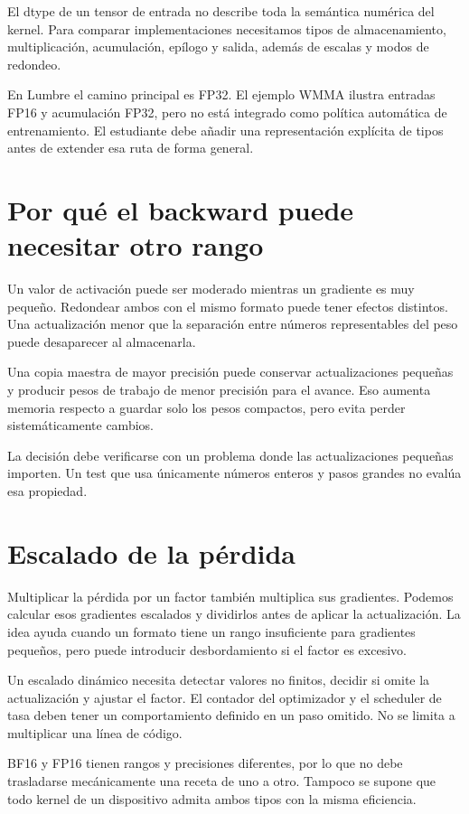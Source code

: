 \documentclass[12pt,a4paper,oneside]{report}
\begin{document}
El dtype de un tensor de entrada no describe toda la semántica numérica del kernel. Para comparar implementaciones necesitamos tipos de almacenamiento, multiplicación, acumulación, epílogo y salida, además de escalas y modos de redondeo.

En Lumbre el camino principal es FP32. El ejemplo WMMA ilustra entradas FP16 y acumulación FP32, pero no está integrado como política automática de entrenamiento. El estudiante debe añadir una representación explícita de tipos antes de extender esa ruta de forma general.

\section{Por qué el backward puede necesitar otro rango}
Un valor de activación puede ser moderado mientras un gradiente es muy pequeño. Redondear ambos con el mismo formato puede tener efectos distintos. Una actualización menor que la separación entre números representables del peso puede desaparecer al almacenarla.

Una copia maestra de mayor precisión puede conservar actualizaciones pequeñas y producir pesos de trabajo de menor precisión para el avance. Eso aumenta memoria respecto a guardar solo los pesos compactos, pero evita perder sistemáticamente cambios.

La decisión debe verificarse con un problema donde las actualizaciones pequeñas importen. Un test que usa únicamente números enteros y pasos grandes no evalúa esa propiedad.

\section{Escalado de la pérdida}
Multiplicar la pérdida por un factor también multiplica sus gradientes. Podemos calcular esos gradientes escalados y dividirlos antes de aplicar la actualización. La idea ayuda cuando un formato tiene un rango insuficiente para gradientes pequeños, pero puede introducir desbordamiento si el factor es excesivo.

Un escalado dinámico necesita detectar valores no finitos, decidir si omite la actualización y ajustar el factor. El contador del optimizador y el scheduler de tasa deben tener un comportamiento definido en un paso omitido. No se limita a multiplicar una línea de código.

BF16 y FP16 tienen rangos y precisiones diferentes, por lo que no debe trasladarse mecánicamente una receta de uno a otro. Tampoco se supone que todo kernel de un dispositivo admita ambos tipos con la misma eficiencia.
\end{document}
